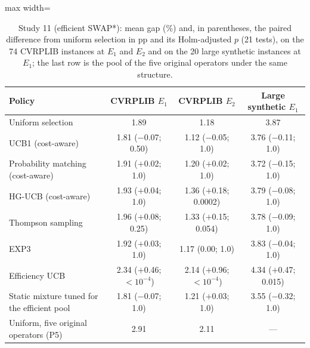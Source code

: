 \begin{table}[t]
\caption{Study 11 (efficient SWAP*): mean gap (\%) and, in parentheses, the paired difference from uniform selection in pp and its Holm-adjusted $p$ (21 tests), on the 74 CVRPLIB instances at $E_1$ and $E_2$ and on the 20 large synthetic instances at $E_1$; the last row is the pool of the five original operators under the same structure.}\label{tab:s11}
\centering
\small
\begin{adjustbox}{max width=\linewidth}
\begin{tabular}{lccc}
\toprule
Policy & CVRPLIB $E_1$ & CVRPLIB $E_2$ & Large synthetic $E_1$ \\
\midrule
Uniform selection & 1.89 & 1.18 & 3.87 \\
UCB1 (cost-aware) & 1.81 ($-$0.07; 0.50) & 1.12 ($-$0.05; 1.0) & 3.76 ($-$0.11; 1.0) \\
Probability matching (cost-aware) & 1.91 ($+$0.02; 1.0) & 1.20 ($+$0.02; 1.0) & 3.72 ($-$0.15; 1.0) \\
HG-UCB (cost-aware) & 1.93 ($+$0.04; 1.0) & 1.36 ($+$0.18; 0.0002) & 3.79 ($-$0.08; 1.0) \\
Thompson sampling & 1.96 ($+$0.08; 0.25) & 1.33 ($+$0.15; 0.054) & 3.78 ($-$0.09; 1.0) \\
EXP3 & 1.92 ($+$0.03; 1.0) & 1.17 (0.00; 1.0) & 3.83 ($-$0.04; 1.0) \\
Efficiency UCB & 2.34 ($+$0.46; \ensuremath{<10^{-4}}) & 2.14 ($+$0.96; \ensuremath{<10^{-4}}) & 4.34 ($+$0.47; 0.015) \\
Static mixture tuned for the efficient pool & 1.81 ($-$0.07; 1.0) & 1.21 ($+$0.03; 1.0) & 3.55 ($-$0.32; 1.0) \\
Uniform, five original operators (P5) & 2.91 & 2.11 & --- \\
\bottomrule
\end{tabular}
\end{adjustbox}
\end{table}
